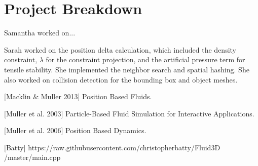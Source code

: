 \documentclass[conference]{IEEEtran}
\begin{document}
\section{Project Breakdown} 
Samantha worked on... 

Sarah worked on the position delta calculation, which included the density constraint, $\lambda$ for the constraint projection, and the artificial pressure term for tensile stability. She implemented the neighbor search and spatial hashing. She also worked on collision detection for the bounding box and object meshes. 



\begin{thebibliography}{}

[Macklin $\&$ Muller 2013] Position Based Fluids. 

[Muller et al. 2003] Particle-Based Fluid Simulation for Interactive Applications. 

[Muller et al. 2006] Position Based Dynamics. 

[Batty] https://raw.githubusercontent.com/christopherbatty/Fluid3D /master/main.cpp

\end{thebibliography}
\end{document}
